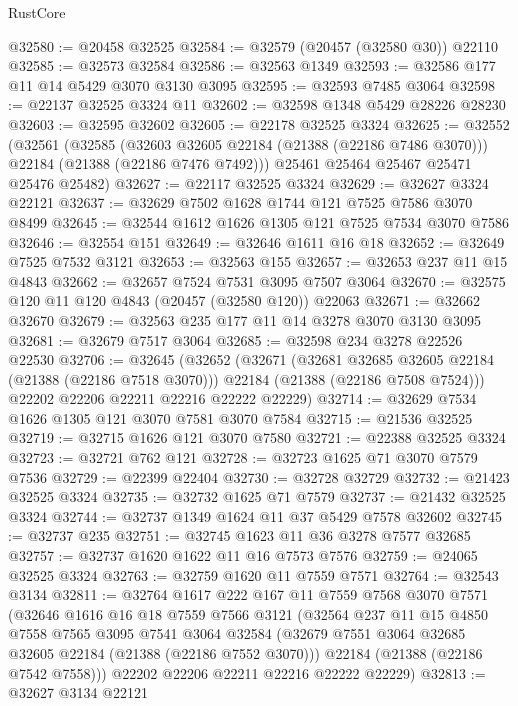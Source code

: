 \begin{lexlean}{RustCore}
\begin{coremodule}
@32580 := @20458 @32525
@32584 := @32579 (@20457 (@32580 @30)) @22110
@32585 := @32573 @32584
@32586 := @32563 @1349
@32593 := @32586 @177 @11 @14 @5429 @3070 @3130 @3095
@32595 := @32593 @7485 @3064
@32598 := @22137 @32525 @3324 @11
@32602 := @32598 @1348 @5429 @28226 @28230
@32603 := @32595 @32602
@32605 := @22178 @32525 @3324
@32625 := @32552
    (@32561
      (@32585
        (@32603 @32605 @22184 (@21388 (@22186 @7486 @3070)))
        @22184
        (@21388 (@22186 @7476 @7492)))
      @25461
      @25464
      @25467
      @25471
      @25476
      @25482)
@32627 := @22117 @32525 @3324
@32629 := @32627 @3324 @22121
@32637 := @32629 @7502 @1628 @1744 @121 @7525 @7586 @3070 @8499
@32645 := @32544 @1612 @1626 @1305 @121 @7525 @7534 @3070 @7586
@32646 := @32554 @151
@32649 := @32646 @1611 @16 @18
@32652 := @32649 @7525 @7532 @3121
@32653 := @32563 @155
@32657 := @32653 @237 @11 @15 @4843
@32662 := @32657 @7524 @7531 @3095 @7507 @3064
@32670 := @32575 @120 @11 @120 @4843 (@20457 (@32580 @120)) @22063
@32671 := @32662 @32670
@32679 := @32563 @235 @177 @11 @14 @3278 @3070 @3130 @3095
@32681 := @32679 @7517 @3064
@32685 := @32598 @234 @3278 @22526 @22530
@32706 := @32645
    (@32652
      (@32671
        (@32681 @32685 @32605 @22184 (@21388 (@22186 @7518 @3070)))
        @22184
        (@21388 (@22186 @7508 @7524)))
      @22202
      @22206
      @22211
      @22216
      @22222
      @22229)
@32714 := @32629 @7534 @1626 @1305 @121 @3070 @7581 @3070 @7584
@32715 := @21536 @32525
@32719 := @32715 @1626 @121 @3070 @7580
@32721 := @22388 @32525 @3324
@32723 := @32721 @762 @121
@32728 := @32723 @1625 @71 @3070 @7579 @7536
@32729 := @22399 @22404
@32730 := @32728 @32729
@32732 := @21423 @32525 @3324
@32735 := @32732 @1625 @71 @7579
@32737 := @21432 @32525 @3324
@32744 := @32737 @1349 @1624 @11 @37 @5429 @7578 @32602
@32745 := @32737 @235
@32751 := @32745 @1623 @11 @36 @3278 @7577 @32685
@32757 := @32737 @1620 @1622 @11 @16 @7573 @7576
@32759 := @24065 @32525 @3324
@32763 := @32759 @1620 @11 @7559 @7571
@32764 := @32543 @3134
@32811 := @32764
    @1617
    @222
    @167
    @11
    @7559
    @7568
    @3070
    @7571
    (@32646
      @1616
      @16
      @18
      @7559
      @7566
      @3121
      (@32564
        @237
        @11
        @15
        @4850
        @7558
        @7565
        @3095
        @7541
        @3064
        @32584
        (@32679 @7551 @3064 @32685 @32605 @22184 (@21388 (@22186 @7552 @3070)))
        @22184
        (@21388 (@22186 @7542 @7558)))
      @22202
      @22206
      @22211
      @22216
      @22222
      @22229)
@32813 := @32627 @3134 @22121

\end{coremodule}
\end{lexlean}
